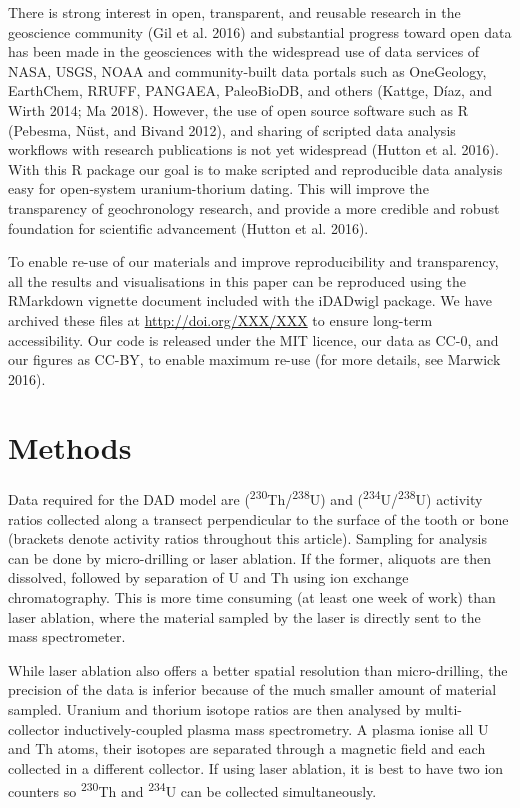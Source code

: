 \documentclass[]{elsarticle} %
\begin{document}
There is strong interest in open, transparent, and reusable research in the geoscience community (Gil et al. 2016) and substantial progress toward open data has been made in the geosciences with the widespread use of data services of NASA, USGS, NOAA and community-built data portals such as OneGeology, EarthChem, RRUFF, PANGAEA, PaleoBioDB, and others (Kattge, Díaz, and Wirth 2014; Ma 2018). However, the use of open source software such as R (Pebesma, Nüst, and Bivand 2012), and sharing of scripted data analysis workflows with research publications is not yet widespread (Hutton et al. 2016). With this R package our goal is to make scripted and reproducible data analysis easy for open-system uranium-thorium dating. This will improve the transparency of geochronology research, and provide a more credible and robust foundation for scientific advancement (Hutton et al. 2016).

To enable re-use of our materials and improve reproducibility and transparency, all the results and visualisations in this paper can be reproduced using the RMarkdown vignette document included with the iDADwigl package. We have archived these files at \url{http://doi.org/XXX/XXX} to ensure long-term accessibility. Our code is released under the MIT licence, our data as CC-0, and our figures as CC-BY, to enable maximum re-use (for more details, see Marwick 2016).

\hypertarget{methods}{%
\section{Methods}\label{methods}}

Data required for the DAD model are (\textsuperscript{230}Th/\textsuperscript{238}U) and (\textsuperscript{234}U/\textsuperscript{238}U) activity ratios collected along a transect perpendicular to the surface of the tooth or bone (brackets denote activity ratios throughout this article). Sampling for analysis can be done by micro-drilling or laser ablation. If the former, aliquots are then dissolved, followed by separation of U and Th using ion exchange chromatography. This is more time consuming (at least one week of work) than laser ablation, where the material sampled by the laser is directly sent to the mass spectrometer.

While laser ablation also offers a better spatial resolution than micro-drilling, the precision of the data is inferior because of the much smaller amount of material sampled. Uranium and thorium isotope ratios are then analysed by multi-collector inductively-coupled plasma mass spectrometry. A plasma ionise all U and Th atoms, their isotopes are separated through a magnetic field and each collected in a different collector. If using laser ablation, it is best to have two ion counters so \textsuperscript{230}Th and \textsuperscript{234}U can be collected simultaneously.
\end{document}
